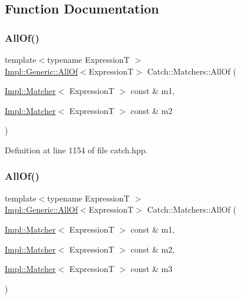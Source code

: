 \subsection{Function Documentation}
\hypertarget{namespace_catch_1_1_matchers_aca6c1c17e137d989583c97f99705797a}{}\label{namespace_catch_1_1_matchers_aca6c1c17e137d989583c97f99705797a} 
\subsubsection{\texorpdfstring{All\+Of()}{AllOf()}\hspace{0.1cm}{\footnotesize\ttfamily [1/2]}}
{\footnotesize\ttfamily template$<$typename ExpressionT $>$ \\
\hyperlink{class_catch_1_1_matchers_1_1_impl_1_1_generic_1_1_all_of}{Impl\+::\+Generic\+::\+All\+Of}$<$ExpressionT$>$ Catch\+::\+Matchers\+::\+All\+Of (\begin{DoxyParamCaption}\item[{\hyperlink{struct_catch_1_1_matchers_1_1_impl_1_1_matcher}{Impl\+::\+Matcher}$<$ ExpressionT $>$ const \&}]{m1,  }\item[{\hyperlink{struct_catch_1_1_matchers_1_1_impl_1_1_matcher}{Impl\+::\+Matcher}$<$ ExpressionT $>$ const \&}]{m2 }\end{DoxyParamCaption})\hspace{0.3cm}{\ttfamily [inline]}}



Definition at line 1154 of file catch.\+hpp.

\hypertarget{namespace_catch_1_1_matchers_a990366f7d62d10d9752ad7b24230def0}{}\label{namespace_catch_1_1_matchers_a990366f7d62d10d9752ad7b24230def0} 
\subsubsection{\texorpdfstring{All\+Of()}{AllOf()}\hspace{0.1cm}{\footnotesize\ttfamily [2/2]}}
{\footnotesize\ttfamily template$<$typename ExpressionT $>$ \\
\hyperlink{class_catch_1_1_matchers_1_1_impl_1_1_generic_1_1_all_of}{Impl\+::\+Generic\+::\+All\+Of}$<$ExpressionT$>$ Catch\+::\+Matchers\+::\+All\+Of (\begin{DoxyParamCaption}\item[{\hyperlink{struct_catch_1_1_matchers_1_1_impl_1_1_matcher}{Impl\+::\+Matcher}$<$ ExpressionT $>$ const \&}]{m1,  }\item[{\hyperlink{struct_catch_1_1_matchers_1_1_impl_1_1_matcher}{Impl\+::\+Matcher}$<$ ExpressionT $>$ const \&}]{m2,  }\item[{\hyperlink{struct_catch_1_1_matchers_1_1_impl_1_1_matcher}{Impl\+::\+Matcher}$<$ ExpressionT $>$ const \&}]{m3 }\end{DoxyParamCaption})\hspace{0.3cm}{\ttfamily [inline]}}



